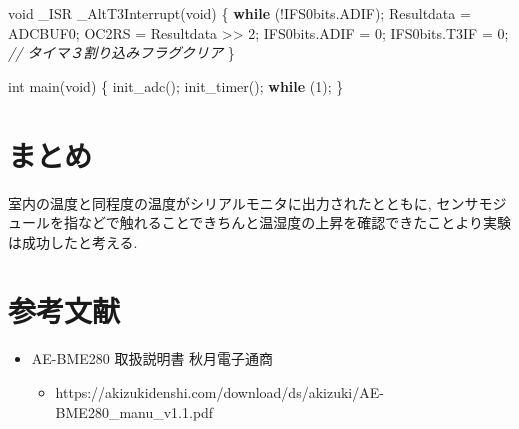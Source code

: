 \documentclass[9pt,a4paper,]{ltjsarticle}
\newenvironment{Shaded}{}{}
\newcommand{\CommentTok}[1]{\textcolor[rgb]{0.38,0.63,0.69}{\textit{#1}}}
\newcommand{\ControlFlowTok}[1]{\textcolor[rgb]{0.00,0.44,0.13}{\textbf{#1}}}
\newcommand{\DataTypeTok}[1]{\textcolor[rgb]{0.56,0.13,0.00}{#1}}
\newcommand{\DecValTok}[1]{\textcolor[rgb]{0.25,0.63,0.44}{#1}}
\newcommand{\NormalTok}[1]{#1}
\providecommand{\tightlist}{%
  \setlength{\itemsep}{0pt}\setlength{\parskip}{0pt}}
\begin{document}
\begin{codelisting}
\begin{Shaded}
\begin{Highlighting}[numbers=left,,]
\DataTypeTok{void}\NormalTok{ _ISR _AltT3Interrupt(}\DataTypeTok{void}\NormalTok{) \{}
  \ControlFlowTok{while}\NormalTok{ (!IFS0bits.ADIF);}
\NormalTok{  Resultdata = ADCBUF0;}
\NormalTok{  OC2RS = Resultdata >> }\DecValTok{2}\NormalTok{;}
\NormalTok{  IFS0bits.ADIF = }\DecValTok{0}\NormalTok{;}
\NormalTok{  IFS0bits.T3IF = }\DecValTok{0}\NormalTok{;  }\CommentTok{// タイマ３割り込みフラグクリア}
\NormalTok{\}}

\DataTypeTok{int}\NormalTok{ main(}\DataTypeTok{void}\NormalTok{) \{}
\NormalTok{  init_adc();}
\NormalTok{  init_timer();}
  \ControlFlowTok{while}\NormalTok{ (}\DecValTok{1}\NormalTok{);}
\NormalTok{\}}
\end{Highlighting}
\end{Shaded}

\end{codelisting}

\clearpage

\hypertarget{ux307eux3068ux3081}{%
\section{まとめ}\label{ux307eux3068ux3081}}

室内の温度と同程度の温度がシリアルモニタに出力されたとともに,
センサモジュールを指などで触れることできちんと温湿度の上昇を確認できたことより実験は成功したと考える.

\hypertarget{ux53c2ux8003ux6587ux732e}{%
\section{参考文献}\label{ux53c2ux8003ux6587ux732e}}

\begin{itemize}
\tightlist
\item
  AE-BME280 取扱説明書 \textbar{} 秋月電子通商

  \begin{itemize}
  \tightlist
  \item
    https://akizukidenshi.com/download/ds/akizuki/AE-BME280\_manu\_v1.1.pdf
  \end{itemize}
\end{itemize}
\end{document}
